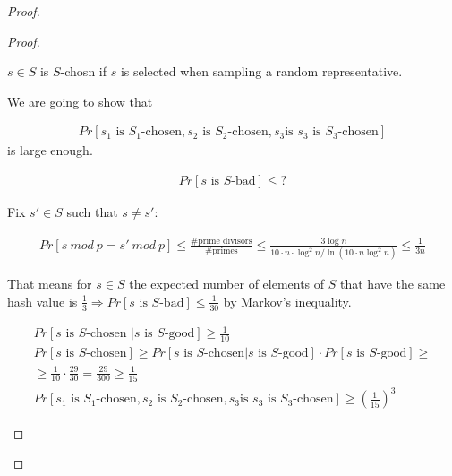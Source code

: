 \begin{proof}
\begin{proof}
\begin{enumerate}
		$s \in S$ is $S$-chosn if $s$ is selected when sampling a random representative.

		We are going to show that 

		\begin{align*}
		  Pr[s_1 \text{ is }S_1\text{-chosen}, s_2 \text{ is }S_2\text{-chosen}, s_3 \text{is } s_3\text{ is } S_3\text{-chosen}]
		\end{align*}
		is large enough.

		\begin{align*}
		  Pr[s \text{ is }S\text{-bad}] \leq ?
		\end{align*}

		Fix $s' \in S$ such that $s \neq s'$:

		\begin{align*}
		  Pr[s \ mod \ p = s' \ mod \ p] \leq \frac{\text{\# prime divisors}}{\text{\# primes}} \leq \frac{3\log n}{10 \cdot n \cdot \log^2 n / \ln(10 \cdot n \log^2 n)} \leq \frac{1}{3 n}
		\end{align*}

		That means for $s \in S$ the expected number of elements of $S$ that have the same hash value is $\frac{1}{3} \Longrightarrow Pr[s \text{ is } S\text{-bad}] \leq \frac{1}{30}$ by Markov's inequality.


		\begin{align*}
		  Pr[s \text{ is } S\text{-chosen } | s \text{ is  } S\text{-good}] \geq \frac{1}{10} \\
		  Pr[s \text { is } S\text{-chosen}] \geq Pr[s \text{ is } S\text{-chosen} | s \text{ is } S\text{-good}] \cdot Pr[s \text { is } S\text{-good}] \geq \\
		  \geq \frac{1}{10} \cdot \frac{29}{30} = \frac{29}{300} \geq \frac{1}{15} \\
		  Pr[s_1 \text{ is }S_1\text{-chosen}, s_2 \text{ is }S_2\text{-chosen}, s_3 \text{is } s_3\text{ is } S_3\text{-chosen}] \geq \left(\frac{1}{15}\right)^{3}
		\end{align*}

	\end{enumerate}
  \end{proof}



\end{proof}

